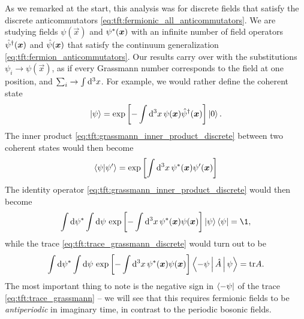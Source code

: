 As we remarked at the start, this analysis was for discrete fields that satisfy the discrete anticommutators \eqref{eq:tft:fermionic_all_anticommutators}.
We are studying fields $\psi(\vec{x})$ and ${\psi}^*({\bm{x}})$ with an infinite number of field operators $\hat\psi^\dagger({\bm{x}})$ and $\hat\psi({\bm{x}})$ that satisfy the continuum generalization \eqref{eq:tft:fermion_anticommutators}.
Our results carry over with the substitutions $\psi_i \rightarrow \psi(\vec{x})$, as if every Grassmann number corresponds to the field at one position, and $\sum_i \rightarrow \int \mathop{}\!\mathrm{d}^3 x$.
For example, we would rather define the coherent state
\begin{equation}
	\ket{\psi} = \exp \left[ -\int \mathop{}\!\mathrm{d}^3 x\, \psi({\bm{x}}) \hat\psi^\dagger({\bm{x}}) \right] \ket{0} .
\end{equation}
The inner product \eqref{eq:tft:grassmann_inner_product_discrete} between two coherent states would then become
\begin{equation}
	\braket{\psi | \psi'} = \exp \left[ \int \mathop{}\!\mathrm{d}^3 x \, {\psi}^*({\bm{x}}) \psi'({\bm{x}}) \right]
\label{eq:tft:grassmann_inner_product}
\end{equation}
The identity operator \eqref{eq:tft:grassmann_inner_product_discrete} would then become
\begin{equation}
	\int \dif \conj\psi \int \dif \psi \, \exp \left[ -\int \dif^3 x \, \conj\psi(\vec{x}) \psi(\vec{x}) \right] \ket{\psi} \bra{\psi} = \1 ,
\label{eq:tft:completeness_grassmann}
\end{equation}
while the trace \eqref{eq:tft:trace_grassmann_discrete} would turn out to be
\begin{equation}
	\int \mathop{}\!\mathrm{d} {\psi}^* \int \mathop{}\!\mathrm{d} \psi \, \exp \left[ -\int \mathop{}\!\mathrm{d}^3 x \, {\psi}^*({\bm{x}}) \psi({\bm{x}}) \right] \Braket{-\psi | \hat{A} | \psi} = \text{tr} A .
\label{eq:tft:trace_grassmann}
\end{equation}
The most important thing to note is the negative sign in $\bra{-\psi}$ of the trace \eqref{eq:tft:trace_grassmann} -- we will see that this requires fermionic fields to be \emph{antiperiodic} in imaginary time, in contrast to the periodic bosonic fields.

